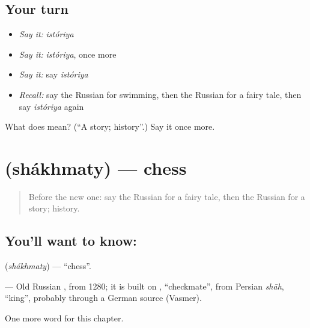\subsection*{Your turn}
\begin{itemize}
\raggedright
  \item \emph{Say it:} \emph{istóriya}
  \item \emph{Say it:} \emph{istóriya}, once more
  \item \emph{Say it:} say \emph{istóriya}
  \item \emph{Recall:} say the Russian for swimming, then the Russian for a fairy tale, then say \emph{istóriya} again
\end{itemize}

\begin{tcolorbox}[breakable,colback=teal!4,colframe=teal!35!black,title={Before you move on}]
What does  mean? (\textquotedblleft{}A story; history\textquotedblright{}.) Say it once more.
\end{tcolorbox}
\section[\texorpdfstring{\ru{шахматы} (shákhmaty)}{шахматы (shákhmaty)}]{ (shákhmaty) — chess}

\label{lesson:RU-C253-shakhmaty}



\begin{quote}
Before the new one: say the Russian for a fairy tale, then the Russian for a story; history.
\end{quote}

\subsection*{You'll want to know: }
\textbf{} (\emph{shákhmaty}) — \textquotedblleft{}chess\textquotedblright{}.

\begin{cousinweb}
\textbf{} — Old Russian \emph{}, from 1280; it is built on \emph{ }, \textquotedblleft{}checkmate\textquotedblright{}, from Persian \emph{shāh}, \textquotedblleft{}king\textquotedblright{}, probably through a German source (Vasmer).
\end{cousinweb}

\begin{grammarlens}[title={What you've built}]
One more word for this chapter.
\end{grammarlens}

